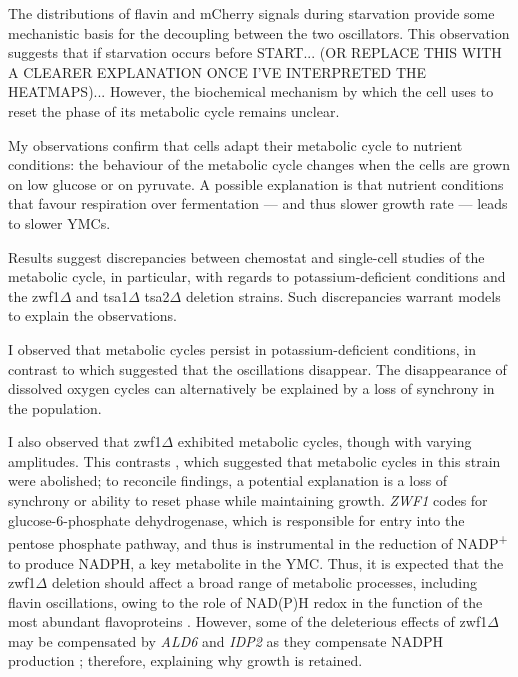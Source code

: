 The distributions of flavin and mCherry signals during starvation provide some mechanistic basis for the decoupling between the two oscillators.
This observation suggests that if starvation occurs before START... (OR REPLACE THIS WITH A CLEARER EXPLANATION ONCE I'VE INTERPRETED THE HEATMAPS)...
However, the biochemical mechanism by which the cell uses to reset the phase of its metabolic cycle remains unclear.

My observations confirm that cells adapt their metabolic cycle to nutrient conditions:
the behaviour of the metabolic cycle changes when the cells are grown on low glucose or on pyruvate.
A possible explanation is that nutrient conditions that favour respiration over fermentation --- and thus slower growth rate --- leads to slower YMCs.

Results suggest discrepancies between chemostat and single-cell studies of the metabolic cycle, in particular, with regards to potassium-deficient conditions and the zwf1$\Delta$ and tsa1$\Delta$ tsa2$\Delta$ deletion strains.
Such discrepancies warrant models to explain the observations.

I observed that metabolic cycles persist in potassium-deficient conditions, in contrast to \textcite{oneillEukaryoticCellBiology2020} which suggested that the oscillations disappear.
The disappearance of dissolved oxygen cycles can alternatively be explained by a loss of synchrony in the population.

I also observed that zwf1$\Delta$ exhibited metabolic cycles, though with varying amplitudes.
This contrasts \textcite{tuCyclicChangesMetabolic2007}, which suggested that metabolic cycles in this strain were abolished; to reconcile findings, a potential explanation is a loss of synchrony or ability to reset phase while maintaining growth.
\textit{ZWF1} codes for glucose-6-phosphate dehydrogenase, which is responsible for entry into the pentose phosphate pathway, and thus is instrumental in the reduction of NADP\textsuperscript{+} to produce NADPH, a key metabolite in the YMC.
Thus, it is expected that the zwf1$\Delta$ deletion should affect a broad range of metabolic processes, including flavin oscillations, owing to the role of NAD(P)H redox in the function of the most abundant flavoproteins \parencite{gudipatiFlavoproteomeYeastSaccharomyces2014}.
However, some of the deleterious effects of zwf1$\Delta$ may be compensated by \textit{ALD6} and \textit{IDP2} as they compensate NADPH production \parencite{minardSourcesNADPHYeast2005}; therefore, explaining why growth is retained.


